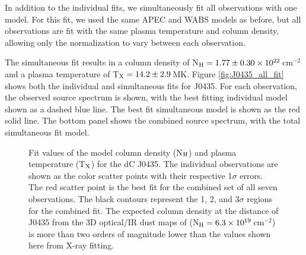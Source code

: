 \documentclass[twocolumn, tighten, times, astrosymb]{aastex631}
\begin{document}


In addition to the individual fits, we simultaneously fit all  observations with one model. For this fit, we used the same APEC and WABS models as before, but all  observations are fit with the same plasma temperature and column density, allowing only the normalization to vary between each observation. 

\begin{figure*}
\centering
\caption{\Chandra\ count rate spectrum in the range $0.3$--$8.0$\,keV for J0435. Each of the seven individual ObsIDs is shown, respectively, in the upper seven panels. Each of the individual observations is fit separately with the same model. The resulting fit for each is shown as the blue dashed line in each panel, with the fit parameters shown in the panel. The combined spectrum of all seven observations is shown in the bottom (last) panel. We fit all seven observations simultaneously, forcing the same column density and plasma temperature, but leave the model normalization free to be fit for each observation. The resulting simultaneous fit is shown as the solid red line in each panel.}
\label{fig:J0435_all_fit}
\end{figure*}


The simultaneous fit results in a column density of N$_{\rm H}=1.77\pm0.30\times10^{22}$\,cm$^{-2}$ and a plasma temperature of T$_{\rm X} = 14.2\pm2.9$\,MK. Figure \ref{fig:J0435_all_fit} shows both the individual and simultaneous fits for J0435. For each observation, the observed source spectrum is shown, with the best fitting individual model shown as a dashed blue line. The best fit simultaneous model is shown as the red solid line. The bottom panel shows the combined source spectrum, with the total simultaneous fit model.

\begin{figure}
\centering
{}
\caption{Fit values of the model column density (N$_{\rm H}$) and plasma temperature (T$_{\rm X}$) for the dC J0435. The individual observations are shown as the color scatter points with their respective 1$\sigma$ errors. The red scatter point is the best fit for the combined set of all seven observations. The black contours represent the 1, 2, and 3$\sigma$ regions for the combined fit. The expected column density at the distance of J0435 from the 3D optical/IR dust maps of \citet{Bayestar2019} (N$_{\rm H} = 6.3\times10^{19}$\,cm$^{-2}$) is more than two orders of magnitude lower than the values shown here from X-ray fitting. }
\label{fig:J0435_NHvsTx}
\end{figure}
\end{document}
